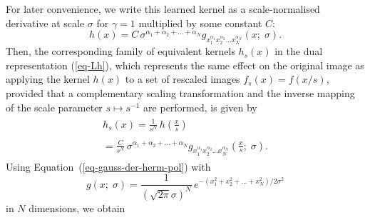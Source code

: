 \documentclass[twocolumn,runningheads]{svjour3}
\begin{document}
For later convenience, we write this learned kernel as a scale-normalised
derivative at scale $\sigma$ for $\gamma = 1$ multiplied by some constant $C$:
\begin{equation}
h(x) = C \, \sigma^{\alpha_1 + \alpha_2 + \dots + \alpha_N} g_{x_1^{\alpha_1} x_2^{\alpha_2} \dots x_N^{\alpha_N}}(x;\; \sigma).
\end{equation}
Then, the corresponding family of equivalent kernels $h_s(x)$ in the dual
representation (\ref{eq-Lh}), 
which represents the same effect on the original image as applying the kernel $h(x)$ 
to a set of rescaled images $f_s(x) = f(x/s)$,
provided that a 
complementary scaling transformation and the inverse mapping of the
scale parameter $s \mapsto s^{-1}$ are performed, is given by
\begin{align}
\begin{split}
h_s(x) 
= \frac{1}{s^N} \, h(\frac{x}{s})
\end{split}\nonumber\\
\begin{split}
= \frac{C}{s^N} \, \sigma^{\alpha_1 + \alpha_2 + \dots + \alpha_N} g_{x_1^{\alpha_1} x_2^{\alpha_2} \dots x_N^{\alpha_N}}(\frac{x}{s};\; \sigma).
\end{split}
\end{align}
Using Equation~(\ref{eq-gauss-der-herm-pol}) with 
\begin{equation}
g(x;\; \sigma) = \frac{1}{(\sqrt{2 \pi} \sigma)^N} \, e^{-(x_1^2 + x_2^2 + \dots + x_N^2)/2\sigma^2} 
\end{equation}
in $N$ dimensions, we obtain
\end{document}
